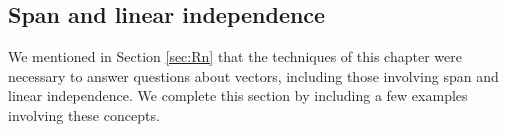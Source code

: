 \subsection*{Span and linear independence}
We mentioned in Section \ref{sec:Rn} that the techniques of this chapter were necessary to answer questions about vectors, including those involving span and linear independence. We complete this section by including a few examples involving these concepts.

\pagebreak

